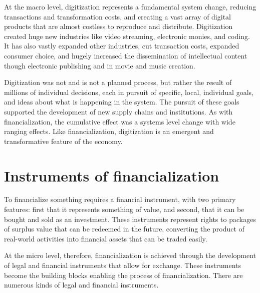 At the macro level, digitization represents a fundamental system change, reducing transactions and transformation costs, and creating a vast array of digital products that are almost costless to reproduce and distribute. Digitization created huge new industries like video streaming, electronic monies, and coding. It has also vastly expanded other industries, %
cut transaction costs, expanded consumer choice, %
and hugely increased the dissemination of intellectual content though electronic publishing and in movie and music creation.   

Digitization was not and is not a planned process, but rather the result of millions of individual decisions, each in pursuit of specific, local, individual goals, and ideas about what is happening in the system. The pursuit of these goals supported the development of  new supply chains and institutions. As with financialization, the cumulative effect was a systems level change with wide ranging effects.  Like  financialization, digitization is an emergent and transformative feature of the economy.

\section{Instruments of financialization }
To financialize something requires a \gls{financial instrument}, with two primary features: first that it represents something of value, and second, that it can be bought and sold as an investment. These instruments represent rights to packages of surplus value that can be redeemed in the future, converting the product of real-world activities into financial assets that can be traded easily. 

At the micro level, therefore, financialization is achieved through the development of legal and financial instruments that allow for exchange. These instruments become the building blocks enabling the process of financialization. There are numerous kinds of legal and financial instruments.

